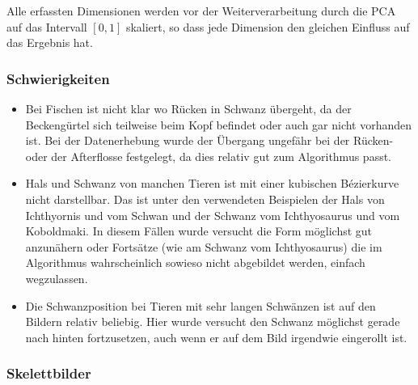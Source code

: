  Alle erfassten Dimensionen werden vor der Weiterverarbeitung durch die PCA auf das Intervall $[0, 1]$ skaliert, so dass jede Dimension den gleichen Einfluss auf das Ergebnis hat. 
 
 \subsubsection{Schwierigkeiten}
 
 \begin{itemize}
  \item Bei Fischen ist nicht klar wo Rücken in Schwanz übergeht, da der Beckengürtel sich teilweise beim Kopf befindet oder auch gar nicht vorhanden ist. Bei der Datenerhebung wurde der Übergang ungefähr bei der Rücken- oder der Afterflosse festgelegt, da dies relativ gut zum Algorithmus passt.
  
  \item Hals und Schwanz von manchen Tieren ist mit einer kubischen Bézierkurve nicht darstellbar. Das ist unter den verwendeten Beispielen der Hals von Ichthyornis und vom Schwan und der Schwanz vom Ichthyosaurus und vom Koboldmaki. In diesem Fällen wurde versucht die Form möglichst gut anzunähern oder Fortsätze (wie am Schwanz vom Ichthyosaurus) die im Algorithmus wahrscheinlich sowieso nicht abgebildet werden, einfach wegzulassen.
  
  \item Die Schwanzposition bei Tieren mit sehr langen Schwänzen ist auf den Bildern relativ beliebig. Hier wurde versucht den Schwanz möglichst gerade nach hinten fortzusetzen, auch wenn er auf dem Bild irgendwie eingerollt ist.
  
 \end{itemize}


 
 \subsubsection{Skelettbilder}
 
